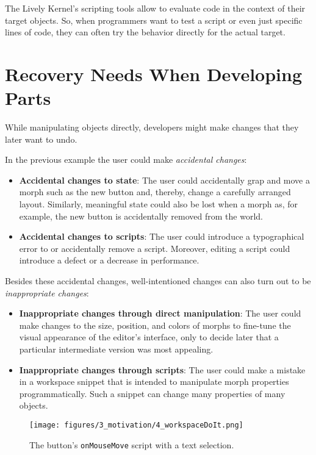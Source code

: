 The Lively Kernel's scripting tools allow to evaluate code in the context of their target objects.
So, when programmers want to test a script or even just specific lines of code, they can often try the behavior directly for the actual target.


\section{Recovery Needs When Developing Parts}

While manipulating objects directly, developers might make changes that they later want to undo.

In the previous example the user could make \emph{accidental changes}:

\begin{itemize}
    \item \textbf{Accidental changes to state}: The user could accidentally grap and move a morph such as the new button and, thereby, change a carefully arranged layout. Similarly, meaningful state could also be lost when a morph as, for example, the new button is accidentally removed from the world.
    \item \textbf{Accidental changes to scripts}: The user could introduce a typographical error to or accidentally remove a script. Moreover, editing a script could introduce a defect or a decrease in performance.
\end{itemize}

Besides these accidental changes, well-intentioned changes can also turn out to be \emph{inappropriate changes}:

\begin{itemize}
    \item \textbf{Inappropriate changes through direct manipulation}: The user could make changes to the size, position, and colors of morphs to fine-tune the visual appearance of the editor's interface, only to decide later that a particular intermediate version was most appealing.
    \item \textbf{Inappropriate changes through scripts}: The user could make a mistake in a workspace snippet that is intended to manipulate morph properties programmatically. Such a snippet can change many properties of many objects.
\end{itemize}

\begin{figure}[h]
    \centering
    \texttt{[image: figures/3\_motivation/4\_workspaceDoIt.png]}
    \caption{The button's \lstinline{onMouseMove} script with a text selection.}
    \label{fig:onMouseOverScript}
\end{figure}

